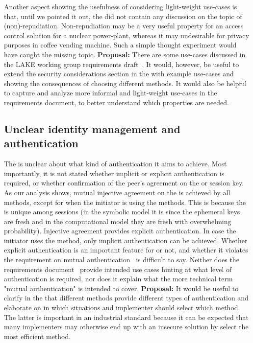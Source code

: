 \documentclass[runningheads]{llncs}
\begin{document}
Another aspect showing the usefulness of considering \mEdhoc light-weight
use-cases is that, until we pointed it out, the \mSpec did not contain
any discussion on the topic of (non)-repudiation.
%
Non-repudiation may be a very useful property for an access control
solution for a nuclear power-plant, whereas it may undesirable for privacy
purposes in coffee vending machine.
%
Such a simple thought experiment would have caught the missing topic.
%
\textbf{Proposal:} There are some use-cases discussed in the LAKE working
group requirements draft~\cite{ietf-lake-reqs-04}.
%
It would, however, be useful to extend the security considerations section in
the \mSpec with example use-cases and showing the consequences of
choosing different methods.
%
It would also be helpful to capture and analyze more informal and light-weight
use-cases in the requirements document, to better understand which properties
are needed.

\subsection{Unclear identity management and authentication}
\label{sec:usableSecurity}
%
The \mSpec is unclear about what kind of authentication it aims to achieve.
%
Most importantly, it is not stated whether implicit or explicit authentication
is required, or whether confirmation of the peer's agreement on the \mSid or
session key.
%
As our analysis shows, mutual injective agreement on the \mSid is achieved
by all methods, except for when the initiator is using the \mStat methods.
%
This is because the \mSid is unique among sessions (in the symbolic model it
is since the ephemeral keys are fresh and in the computational model they are
fresh with overwhelming probability).
%
Injective agreement provides explicit authentication.
%
In case the initiator uses the \mStat method, only implicit authentication
can be achieved.
%
Whether explicit authentication is an important feature for \mEdhoc or not, and
whether it violates the requirement on mutual
authentication~\cite{ietf-lake-reqs-04} is difficult to say.
%
Neither does the requirements document~\cite{ietf-lake-reqs-04} provide
intended use cases hinting at what level of authentication is required, nor does
it explain what the more technical term "mutual authentication"
is intended to cover.
%
\textbf{Proposal:}
It would be useful to clarify in the \mSpec that different methods provide
different types of authentication and elaborate on in which situations and
implementer should select which method.
%
The latter is important in an industrial standard because it can be expected
that many implementers may otherwise end up with an insecure solution
by select the most efficient method.
%
\end{document}
